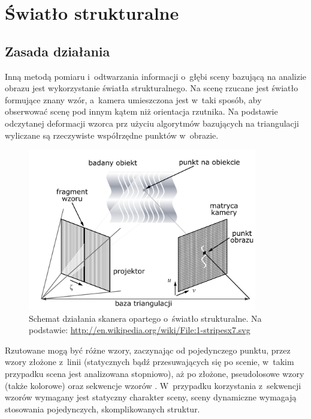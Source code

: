 \section{Światło strukturalne}

\subsection{Zasada działania}

Inną metodą pomiaru i~odtwarzania informacji o~głębi sceny bazującą na analizie
obrazu jest wykorzystanie światła strukturalnego. Na scenę rzucane jest światło
formujące znany wzór, a~kamera umieszczona jest w~taki sposób, aby obserwować
scenę pod innym kątem niż orientacja rzutnika. Na podstawie odczytanej deformacji
wzorca prz użyciu algorytmów bazujących na triangulacji wyliczane są rzeczywiste
współrzędne punktów w~obrazie.

\begin{figure}[htb!]
\centering
\includegraphics[width=10cm]{../../Common/img/struct}
\caption[Schemat działania skanera opartego o~światło strukturalne]
{Schemat działania skanera opartego o~światło strukturalne. Na podstawie:
\url{http://en.wikipedia.org/wiki/File:1-stripesx7.svg}}
\label{fig:struct_principle}
\end{figure}

Rzutowane mogą być różne wzory, zaczynając od pojedynczego punktu, przez
wzory złożone z~linii (statycznych bądź przesuwających się po
scenie, w~takim przypadku scena jest analizowana stopniowo), aż po złożone,
pseudolosowe wzory (także kolorowe) oraz sekwencje wzorów \cite{1588327}.
W~przypadku korzystania z~sekwencji wzorów wymagany jest statyczny charakter
sceny, sceny dynamiczne wymagają stosowania pojedynczych, skomplikowanych
struktur.

